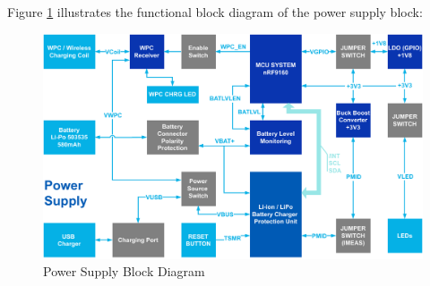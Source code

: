 \documentclass[report.tex]{subfiles}
\begin{document}
Figure \ref{fig:power_supply_blk} illustrates the functional block diagram of the power supply block:

\begin{figure}[H]
	\centering
	\includegraphics[width=1\textwidth]{Include/Figure/Hardware/power_supply_blk.pdf}
	\caption{Power Supply Block Diagram}
	\label{fig:power_supply_blk}
\end{figure}

\pagebreak
\end{document}
